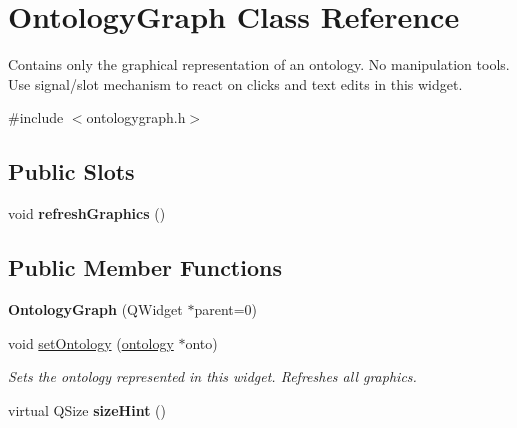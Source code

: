 \hypertarget{class_ontology_graph}{\section{\-Ontology\-Graph \-Class \-Reference}
\label{class_ontology_graph}
}


\-Contains only the graphical representation of an ontology. \-No manipulation tools. \-Use signal/slot mechanism to react on clicks and text edits in this widget.  




{\ttfamily \#include $<$ontologygraph.\-h$>$}

\subsection*{\-Public \-Slots}
\begin{DoxyCompactItemize}
\item 
\hypertarget{class_ontology_graph_a7b8024f8235e0e5ef28aa8bedc365875}{void {\bfseries refresh\-Graphics} ()}\label{class_ontology_graph_a7b8024f8235e0e5ef28aa8bedc365875}

\end{DoxyCompactItemize}
\subsection*{\-Public \-Member \-Functions}
\begin{DoxyCompactItemize}
\item 
\hypertarget{class_ontology_graph_ac6d0577ace6e9cbbf579fe920ba43698}{{\bfseries \-Ontology\-Graph} (\-Q\-Widget $\ast$parent=0)}\label{class_ontology_graph_ac6d0577ace6e9cbbf579fe920ba43698}

\item 
\hypertarget{class_ontology_graph_aa326a998c95ee0ab9ac09408295f1fcb}{void \hyperlink{class_ontology_graph_aa326a998c95ee0ab9ac09408295f1fcb}{set\-Ontology} (\hyperlink{classmbdev__ontology_1_1ontology}{ontology} $\ast$onto)}\label{class_ontology_graph_aa326a998c95ee0ab9ac09408295f1fcb}

\begin{DoxyCompactList}\small\item\em \-Sets the ontology represented in this widget. \-Refreshes all graphics. \end{DoxyCompactList}\item 
\hypertarget{class_ontology_graph_a5abc01405b0f3ed8aa2fc39f1972d823}{virtual \-Q\-Size {\bfseries size\-Hint} ()}\label{class_ontology_graph_a5abc01405b0f3ed8aa2fc39f1972d823}

\end{DoxyCompactItemize}


